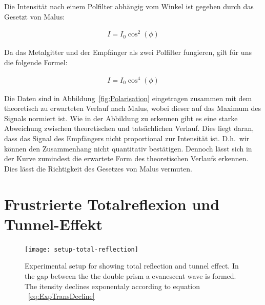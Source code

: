 \documentclass[a4paper,10pt,twocolumn]{article}
\begin{document}
    Die Intensität nach einem Polfilter abhängig vom Winkel ist gegeben durch das Gesetzt von Malus:
    
    \begin{align}
        I = I_0 \cos^2(\phi)
    \end{align}
    
    Da das Metalgitter und der Empfänger als zwei Polfilter fungieren, gilt für uns die folgende Formel:
    
    \begin{align}
        \label{eq:cos4}
        I = I_0 \cos^4( \phi )
    \end{align}
    
    
    Die Daten sind in Abbildung~\ref{fig:Polarisation} eingetragen zusammen mit dem theoretisch zu erwarteten
    Verlauf nach Malus, wobei dieser auf das Maximum des Signals normiert ist.
    Wie in der Abbildung zu erkennen gibt es eine starke Abweichung zwischen theoretischen und tatsächlichen
    Verlauf.
    Dies liegt daran, dass das Signal des Empfängers nicht proportional zur Intensität ist.
    D.h.\ wir können den Zusammenhang nicht quantitativ bestätigen.
    Dennoch lässt sich in der Kurve zumindest die erwartete Form des theoretischen Verlaufs erkennen.
    Dies lässt die Richtigkeit des Gesetzes von Malus vermuten.
    
    \section{Frustrierte Totalreflexion und Tunnel-Effekt}
    
    \begin{figure}[htbp]
        \texttt{[image: setup-total-reflection]}
        \centering
        \caption{Experimental setup for showing total reflection and tunnel effect.
        In the gap between the the double prism a evanescent wave is formed.
        The itensity declines exponentaly according to equation ~\eqref{eq:ExpTransDecline}}
        \label{fig:SetupTotalReflection}
    \end{figure}
\end{document}
